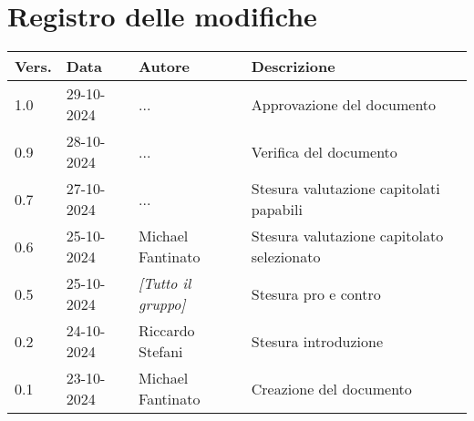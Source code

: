 \section*{Registro delle modifiche}

\begin{table}[h]
    \centering
    \begin{tabular}{|l|l|l|l|}
        \hline
        \rowcolor[gray]{0.9}
        \textbf{Vers.} & \textbf{Data} & \textbf{Autore} & \textbf{Descrizione}\\
        \hline
        1.0 & 29-10-2024 & ... & Approvazione del documento\\
        \hline
        0.9 & 28-10-2024 & ... & Verifica del documento\\
        \hline
        0.7 & 27-10-2024 & ... & Stesura valutazione capitolati papabili\\
        \hline
        0.6 & 25-10-2024 & Michael Fantinato & Stesura valutazione capitolato selezionato\\
        \hline
        0.5 & 25-10-2024 & \emph{[Tutto il gruppo]} & Stesura pro e contro\\
        \hline
        0.2 & 24-10-2024 & Riccardo Stefani & Stesura introduzione\\
        \hline
        0.1 & 23-10-2024 & Michael Fantinato & Creazione del documento\\
        \hline
    \end{tabular}
\end{table}
